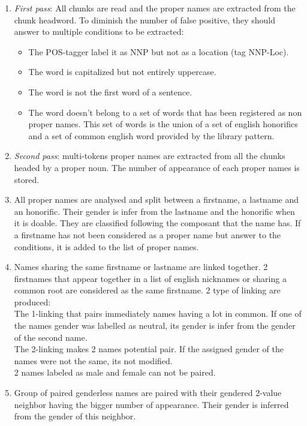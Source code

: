 \documentclass[a4paper, 12pt]{report}
\begin{document}
\begin{enumerate}
    \item \textit{First pass}: All chunks are read and the proper names are extracted from the chunk headword. To diminish the number of false positive, they should answer to multiple conditions to be extracted:
    \begin{itemize}
        \item The POS-tagger label it as NNP but not as a location (tag NNP-Loc).
        \item The word is capitalized but not entirely uppercase.
        \item The word is not the first word of a sentence.
        \item The word doesn't belong to a set of words that has been registered as non proper names. This set of words is the union of a set of english honorifics and a set of common english word provided by the library pattern.
    \end{itemize}
    \item \textit{Second pass}: multi-tokens proper names are extracted from all the chunks headed by a proper noun. The number of appearance of each proper names is stored.
    
    \item All proper names are analysed and split between a firstname, a lastname and an honorific. Their gender is infer from the lastname and the honorific when it is doable. They are classified following the composant that the name has. If a firstname has not been considered as a proper name but answer to the conditions, it is added to the list of proper names.
    
    \item Names sharing the same firstname or lastname are linked together. 2 firstnames that appear together in a list of english nicknames or sharing a common root are considered as the same firstname. 2 type of linking are produced:\\ 
    The 1-linking that pairs immediately names having a lot in common. If one of the names gender was labelled as neutral, its gender is infer from the gender of the second name. \\ 
    The 2-linking makes 2 names potential pair. If the assigned gender of the names were not the same, its not modified.\\
    2 names labeled as male and female can not be paired.
    
    \item Group of paired genderless names are paired with their gendered 2-value neighbor having the bigger number of appearance. Their gender is inferred from the gender of this neighbor.
    

\end{enumerate}
\end{document}
